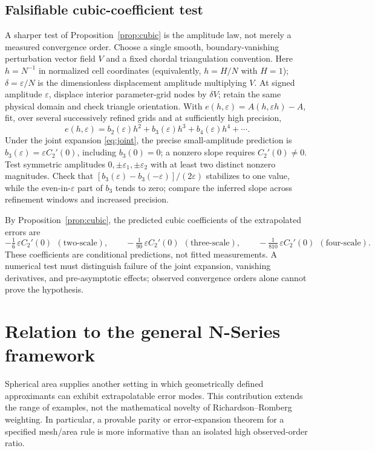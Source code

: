 \documentclass[11pt]{article}
\theoremstyle{remark}
\begin{document}
\subsection{Falsifiable cubic-coefficient test}
A sharper test of Proposition~\ref{prop:cubic} is the amplitude law, not merely a measured convergence order.
Choose a single smooth, boundary-vanishing perturbation vector field $V$ and a fixed chordal
triangulation convention. Here $h=N^{-1}$ in normalized cell coordinates (equivalently,
$h=H/N$ with $H=1$); $\delta=\varepsilon/N$ is the dimensionless displacement amplitude
multiplying $V$. At signed amplitude $\varepsilon$, displace interior parameter-grid nodes by
$\delta V$; retain the same physical domain and check triangle orientation. With
$e(h,\varepsilon)=A(h,\varepsilon h)-A$, fit, over several successively refined grids and at
sufficiently high precision,
\begin{equation}\label{eq:fit}
e(h,\varepsilon)=b_2(\varepsilon)h^2+b_3(\varepsilon)h^3+b_4(\varepsilon)h^4+\cdots .
\end{equation}
Under the joint expansion \eqref{eq:joint}, the precise small-amplitude prediction is
$b_3(\varepsilon)=\varepsilon C_2'(0)$, including $b_3(0)=0$; a nonzero slope requires
$C_2'(0)\neq0$. Test symmetric amplitudes $0,\pm\varepsilon_1,\pm\varepsilon_2$ with at least
two distinct nonzero magnitudes. Check that $[b_3(\varepsilon)-b_3(-\varepsilon)]/(2\varepsilon)$
stabilizes to one value, while the even-in-$\varepsilon$ part of $b_3$ tends to zero; compare the
inferred slope across refinement windows and increased precision.

By Proposition~\ref{prop:cubic}, the predicted cubic coefficients of the extrapolated errors are
\[
-\tfrac16\,\varepsilon C_2'(0)\ \ (\text{two-scale}),\qquad
-\tfrac1{90}\,\varepsilon C_2'(0)\ \ (\text{three-scale}),\qquad
-\tfrac1{810}\,\varepsilon C_2'(0)\ \ (\text{four-scale}).
\]
These coefficients are conditional predictions, not fitted measurements. A numerical test must distinguish failure of the joint expansion, vanishing derivatives, and pre-asymptotic effects; observed convergence orders alone cannot prove the hypothesis.

\section{Relation to the general N-Series framework}
Spherical area supplies another setting in which geometrically defined approximants can exhibit
extrapolatable error modes. This contribution extends the range of examples, not the
mathematical novelty of Richardson--Romberg weighting. In particular, a provable parity or
error-expansion theorem for a specified mesh/area rule is more informative than an isolated
high observed-order ratio.
\end{document}

